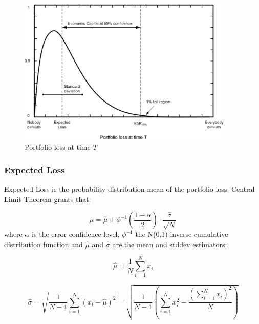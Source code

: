 \documentclass[a4paper,12pt,final]{article}
\begin{document}
\begin{figure}[!hbt]
\begin{center}
\includegraphics[height=7cm, angle=0]{./images/creditvar.eps}
\caption{Portfolio loss at time $T$}
\label{creditvar}
\end{center}
\end{figure}
\FloatBarrier

\subsubsection{Expected Loss}
Expected Loss is the probability distribution mean of the portfolio loss.
Central Limit Theorem \cite{stats:schaum} grants that:

\begin{displaymath}
\mu = \widehat{\mu} \pm \phi^{-1}\left(\frac{1-\alpha}{2}\right) \cdot \frac{\widehat{\sigma}}{\sqrt{N}}
\end{displaymath}
where $\alpha$ is the error confidence level, $\phi^{-1}$ the N(0,1) inverse 
cumulative distribution function and $\widehat{\mu}$ and $\widehat{\sigma}$ are 
the mean and stddev estimators:

\begin{displaymath}
\widehat{\mu} = \frac{1}{N} \sum_{i=1}^{N} x_i
\end{displaymath}

\begin{displaymath}
\widehat{\sigma} =
\sqrt{\frac{1}{N-1} \sum_{i=1}^{N} \left( x_i - \widehat{\mu} \right)^2} =
\sqrt{\frac{1}{N-1} \left( \sum_{i=1}^{N} x_i^2 - \frac{\left(\sum_{i=1}^{N} x_i \right)^2}{N} \right)}
\end{displaymath}

\end{document}
